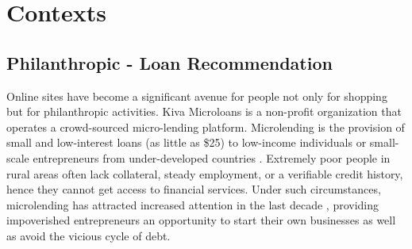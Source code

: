 





\section{Contexts}
    \subsection{Philanthropic - Loan Recommendation}

    Online sites have become a significant avenue for people not only for shopping but for philanthropic activities. Kiva Microloans is a non-profit organization that operates a crowd-sourced micro-lending platform. Microlending is the provision of small and low-interest loans (as little as \$25) to low-income individuals or small-scale entrepreneurs from under-developed countries \cite{yunus1998banker}. Extremely poor people in rural areas often lack collateral, steady employment, or a verifiable credit history, hence they cannot get access to financial services. Under such circumstances, microlending has attracted increased attention in the last decade \cite{chen2017microfinance}, providing impoverished entrepreneurs an opportunity to start their own businesses as well as avoid the vicious cycle of debt.
    
